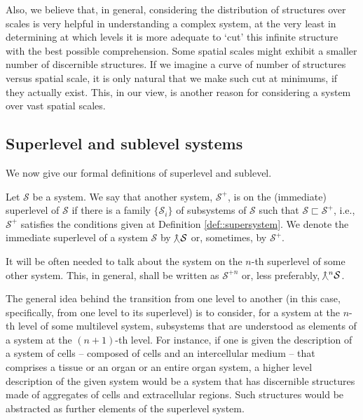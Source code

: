 Also, we believe that, in general, considering the distribution of structures over scales is very helpful in understanding a complex system, at the very least in determining at which levels it is more adequate to `cut' this infinite structure with the best possible comprehension. Some spatial scales might exhibit a smaller number of discernible structures. If we imagine a curve of number of structures versus spatial scale, it is only natural that we make such cut at minimums, if they actually exist. This, in our view, is another reason for considering a system over vast spatial scales. 

\subsection{Superlevel and sublevel systems}

We now give our formal definitions of superlevel and sublevel.

\begin{definition} \label{def::Slevel}
	Let $\mathcal{S}$ be a system. We say that another system, $\mathcal{S}^+$, is on the (immediate) superlevel of $\mathcal{S}$ if there is a family $\{\mathcal{S}_i\}$ of subsystems of $\mathcal{S}$ such that $\mathcal{S} \sqsubset \mathcal{S}^+$, i.e., $\mathcal{S}^+$ satisfies the conditions given at Definition \ref{def::supersystem}. We denote the immediate superlevel of a system $\mathcal{S}$ by $\Slv{\mathcal{S}}$ or, sometimes, by $\mathcal{S}^+$.
\end{definition}

It will be often needed to talk about the system on the $n$-th superlevel of some other system. This, in general, shall be written as $\mathcal{S}^{+n}$ or, less preferably, $\Slv[n]{\mathcal{S}}$.

The general idea behind the transition from one level to another (in this case, specifically, from one level to its superlevel) is to consider, for a system at the $n$-th level of some multilevel system, subsystems that are understood as elements of a system at the $(n+1)$-th level. For instance, if one is given the description of a system of cells -- composed of cells and an intercellular medium -- that comprises a tissue or an organ or an entire organ system, a higher level description of the given system would be a system that has discernible structures made of aggregates of cells and extracellular regions. Such structures would be abstracted as further elements of the superlevel system. 

